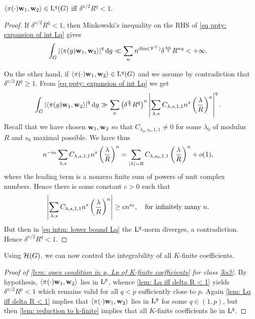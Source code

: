 \documentclass[a4paper, 10pt]{article}
\begin{document}
\begin{lemma}\label{lem: Lq iff delta R < 1}
    $\left\langle\pi(\cdot)\mathbf{w}_1,\mathbf{w}_2 \right\rangle\in\mathrm{L}^q(G)$ iff $\delta^{\kappa/2}R^q<1$.
\end{lemma}
\begin{proof}
    If $\delta^{\kappa/2}R^q<1$, then Minkowski's inequality on the RHS of \eqref{eq ppty: expansion of int Lq} gives
    \begin{equation*}
        \int_G \left|\left\langle\pi(g)\mathbf{w}_1,\mathbf{w}_2 \right\rangle\right|^q\mathop{}\!\mathrm{d} g \ll \sum_{n} n^{\dim(\mathscr{V}^U)} \delta^{\frac{\kappa n}{2}} R^{nq} < +\infty.
    \end{equation*}

    On the other hand, if $\left\langle\pi(\cdot)\mathbf{w}_1,\mathbf{w}_2 \right\rangle\in\mathrm{L}^q(G)$ and we assume by contradiction that $\delta^{\kappa/2}R^q\geq 1$. From \eqref{eq ppty: expansion of int Lq} we get
    \begin{equation}\label{eq intm: lower bound Lq}
        \int_G \left|\left\langle\pi(g)\mathbf{w}_1,\mathbf{w}_2 \right\rangle\right|^q\mathop{}\!\mathrm{d} g \gg \sum_n \left(\delta^{\frac{\kappa}{2}}R^q\right)^n \left| \sum_{\lambda,s} C_{\lambda,s,1,1} n^s \left(\frac{\lambda}{R}\right)^n  \right|^q.
    \end{equation}
    Recall that we have chosen $\mathbf{w}_1,\mathbf{w}_2$ so that $C_{\lambda_0,s_0,1,1}\ne 0$ for some $\lambda_0$ of modulus $R$ and $s_0$ maximal possible. We have thus
    \begin{equation*}
        n^{-s_0} \sum_{\lambda, s} C_{\lambda,s,1,1} n^s \left(\frac{\lambda}{R}\right)^n = \sum_{\left| \lambda \right|=R} C_{\lambda,s_0,1,1} \left(\frac{\lambda}{R}\right)^n + o(1),
    \end{equation*}
    where the leading term is a nonzero finite sum of powers of unit complex numbers.
    Hence there is some constant $c>0$ such that
    \begin{equation*}
        \left| \sum_{\lambda,s} C_{\lambda,s,1,1} n^s \left(\frac{\lambda}{R}\right)^n  \right| \geq c n^{s_0}, \quad \text{for infinitely many $n$.}
    \end{equation*}
    But then in \eqref{eq intm: lower bound Lq} the $\mathrm{L}^q$-norm diverges, a contradiction. Hence $\delta^{\kappa/2}R^q < 1$.
\end{proof}

Using $\mathcal{H}(G)$, we can now control the integrability of all $K$-finite coefficients.
\begin{proof}[Proof of \autoref{lem: open condition in p, Lp of K-finite coefficients} for class \ref{ks3}]
    By hypothesis, $\left\langle\pi(\cdot)\mathbf{w}_1,\mathbf{w}_2 \right\rangle$ lies in $\mathrm{L}^p$, whence \autoref{lem: Lq iff delta R < 1} yields $\delta^{\kappa/2} R^p < 1$ which remains valid for all $q<p$ sufficiently close to $p$. Again \autoref{lem: Lq iff delta R < 1} implies that $\left\langle\pi(\cdot)\mathbf{w}_1,\mathbf{w}_2 \right\rangle$ lies in $\mathrm{L}^q$ for some $q\in (1,p)$, but then \autoref{lem: reduction to k-finite} implies that all $K$-finite coefficients lie in $\mathrm{L}^q$.
\end{proof}
\end{document}
